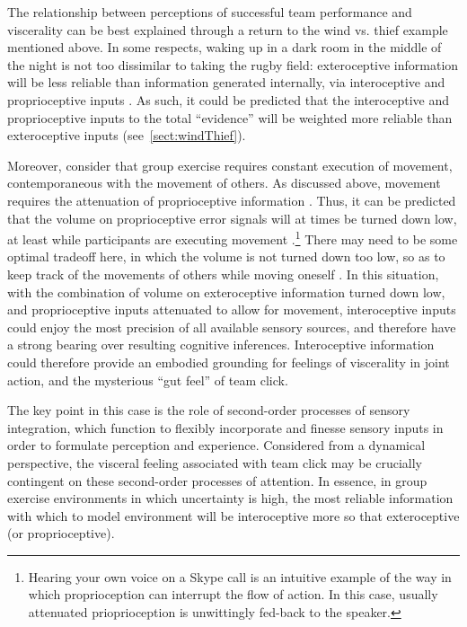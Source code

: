 \begin{CJK}{UTF8}{gbsn}

The relationship between perceptions of successful team performance and viscerality can be best explained through a return to the wind vs. thief example mentioned above.  In some respects, waking up in a dark room in the middle of the night is not too dissimilar to taking the rugby field: exteroceptive information will be less reliable than information generated internally, via interoceptive and proprioceptive inputs \citep{Pezzulo2014}. As such, it could be predicted that the interoceptive and proprioceptive inputs to the total ``evidence'' will be weighted more reliable than exteroceptive inputs (see~\ref{sect:windThief}).

Moreover, consider that group exercise requires constant execution of movement, contemporaneous with the movement of others. As discussed above, movement requires the attenuation of proprioceptive information \citep[so as not to interrupt the flow of movement itself, see][]{Dietrich2004a}.  Thus, it can be predicted that the volume on proprioceptive error signals will at times be turned down low, at least while participants are executing movement \citep{Friston2015}.\footnote{Hearing your own voice on a Skype call is an intuitive example of the way in which proprioception can interrupt the flow of action. In this case, usually attenuated prioprioception is unwittingly fed-back to the speaker.}  There may need to be some optimal tradeoff here, in which the volume is not turned down too low, so as to keep track of the movements of others while moving oneself \citep{Pesquita2017}.  In this situation, with the combination of volume on exteroceptive information turned down low, and proprioceptive inputs attenuated to allow for movement, interoceptive inputs could enjoy the most precision of all available sensory sources, and therefore have a strong bearing over resulting cognitive inferences.  Interoceptive information could therefore provide an embodied grounding for feelings of viscerality in joint action, and the mysterious ``gut feel'' of team click.

The key point in this case is the role of second-order processes of sensory integration, which function to flexibly incorporate and finesse sensory inputs in order to formulate perception and experience.  Considered from a dynamical perspective, the visceral feeling associated with team click may be crucially contingent on these second-order processes of attention.  In essence, in group exercise environments in which uncertainty is high, the most reliable information with which to model environment will be interoceptive more so that exteroceptive (or proprioceptive).


\end{CJK}
